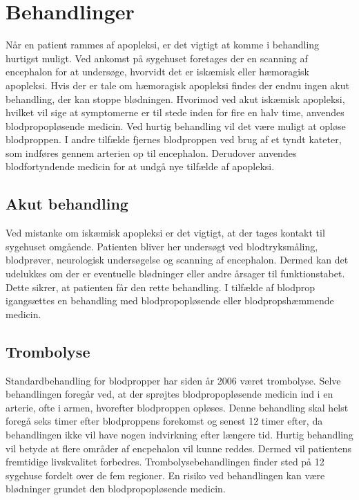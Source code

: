 \section{Behandlinger}
Når en patient rammes af apopleksi, er det vigtigt at komme i behandling hurtigst muligt. Ved ankomst på sygehuset foretages der en scanning af encephalon for at undersøge, hvorvidt det er iskæmisk eller hæmoragisk apopleksi. Hvis der er tale om hæmoragisk apopleksi findes der endnu ingen akut behandling, der kan stoppe blødningen.\cite{Soenderborg2013} Hvorimod ved akut iskæmisk apopleksi, hvilket vil sige at symptomerne er til stede inden for fire en halv time, anvendes blodpropopløsende medicin. Ved hurtig behandling vil det være muligt at opløse blodproppen. I andre tilfælde fjernes blodproppen ved brug af et tyndt kateter, som indføres gennem arterien op til encephalon. Derudover anvendes blodfortyndende medicin for at undgå nye tilfælde af apopleksi. \cite{Hjerteforeningen2014, Kruuse2014a} 

\subsection{Akut behandling}
Ved mistanke om iskæmisk apopleksi er det vigtigt, at der tages kontakt til sygehuset omgående. Patienten bliver her undersøgt ved blodtryksmåling, blodprøver, neurologisk undersøgelse og scanning af encephalon. Dermed kan det udelukkes om der er eventuelle blødninger eller andre årsager til funktionstabet. Dette  sikrer, at patienten får den rette behandling. I tilfælde af blodprop igangsættes en behandling med blodpropopløsende eller blodpropshæmmende medicin. \cite{Hjerteforeningen2014, Kruuse2014a} 

\subsection{Trombolyse}
Standardbehandling for blodpropper har siden år 2006 været trombolyse. Selve behandlingen foregår ved, at der sprøjtes blodpropopløsende medicin ind i en arterie, ofte i armen, hvorefter blodproppen opløses. Denne behandling skal helst foregå seks timer efter blodproppens forekomst og senest 12 timer efter, da behandlingen ikke vil have nogen indvirkning efter længere tid. Hurtig behandling vil betyde at flere områder af encpehalon vil kunne reddes. Dermed vil patientens fremtidige livskvalitet forbedres. Trombolysebehandlingen finder sted på 12 sygehuse fordelt over de fem regioner. En risiko ved behandlingen kan være blødninger grundet den blodpropopløsende medicin. \cite{Hjernesagen2015b} 

